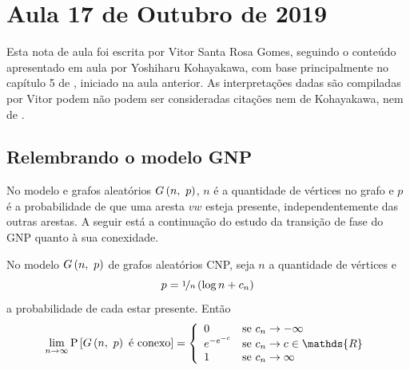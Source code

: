 \section{Aula 17 de Outubro de 2019}
\label{2019_10_17}

Esta nota de aula foi escrita por Vitor Santa Rosa Gomes, seguindo o conteúdo apresentado em aula por Yoshiharu Kohayakawa, com base principalmente no capítulo 5 de \cite[p.~245]{blum_hopcroft}, iniciado na aula anterior. As interpretações dadas são compiladas por Vitor podem não podem ser consideradas citações nem de Kohayakawa, nem de \cite{blum_hopcroft}.

\subsection*{Relembrando o modelo GNP}

No modelo e grafos aleatórios $G\left(n,\ p\vphantom{1j}\right)$, $n$ é a quantidade de vértices no grafo e $p$ é a probabilidade de que uma aresta $vw$ esteja presente, independentemente das outras arestas. A seguir está a continuação do estudo da transição de fase do GNP quanto à sua conexidade.

\begin{teorema}
  No modelo $G\left(n,\ p\vphantom{1j}\right)$ de grafos aleatórios CNP, seja $n$ a quantidade de vértices e 
  \[
    p = \nicefrac{1}{n}\left(\log n + c_n\vphantom{1j}\right)
  \]
  a probabilidade de cada estar presente. Então
  \vspace*{-\baselineskip}
  \[
    \lim_{n\rightarrow\infty} \mathrm{P}\left[G\left(n,\ p\vphantom{1j}\right) \text{ é conexo}\vphantom{1j}\right] = \left\{\begin{array}{ll}
      0                               & \text{se } c_n\rightarrow-\infty                            \\
      \mathrel{e}^{-\mathrel{e}^{-c}} & \text{se } c_n\rightarrow c\in\mathds{R}                    \\
      1                               & \text{se } c_n\rightarrow\infty                             \\
    \end{array}\vphantom{1j}\right.
  \]
\end{teorema}

